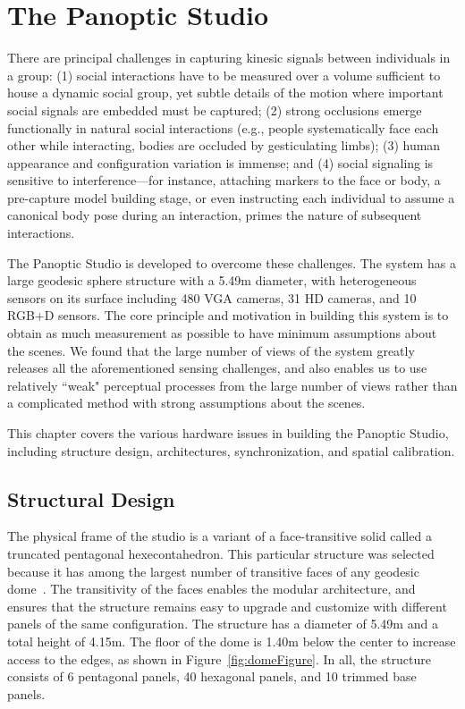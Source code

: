 \chapter{The Panoptic Studio}%
\label{chapter:system}

There are principal challenges in capturing kinesic signals between individuals in a group: (1) social interactions have to be measured over a volume sufficient to house a dynamic social group, yet subtle details of the motion where important social signals are embedded must be captured; (2) strong occlusions emerge functionally in natural social interactions (e.g., people systematically face each other while interacting, bodies are occluded by gesticulating limbs); (3) human appearance and configuration variation is immense; and (4) social signaling is sensitive to interference---for instance, attaching markers to the face or body, a pre-capture model building stage, or even instructing each individual to assume a canonical body pose during an interaction, primes the nature of subsequent interactions. 

The Panoptic Studio is developed to overcome these challenges. The system has a large geodesic sphere structure with a 5.49m diameter, with heterogeneous sensors on its surface including 480 VGA cameras, 31 HD cameras, and 10 RGB+D sensors. The core principle and motivation in building this system is to obtain as much measurement as possible to have minimum assumptions about the scenes. We found that the large number of views of the system greatly releases all the aforementioned sensing challenges, and also enables us to use relatively ``weak" perceptual processes from the large number of views rather than a complicated method with strong assumptions about the scenes.
 
This chapter covers the various hardware issues in building the Panoptic Studio, including structure design, architectures, synchronization, and spatial calibration.  


\section{Structural Design}
	The physical frame of the studio is a variant of a face-transitive solid called a truncated pentagonal hexecontahedron. This particular structure was selected because it has among the largest number of transitive faces of any geodesic dome~\cite{Williams1979}. The transitivity of the faces enables the modular architecture, and ensures that the structure remains easy to upgrade and customize with different panels of the same configuration. The structure has a diameter of 5.49m and a total height of 4.15m. The floor of the dome is 1.40m below the center to increase access to the edges, as shown in Figure~\ref{fig:domeFigure}. In all, the structure consists of 6 pentagonal panels, 40 hexagonal panels, and 10 trimmed base panels. 
	
